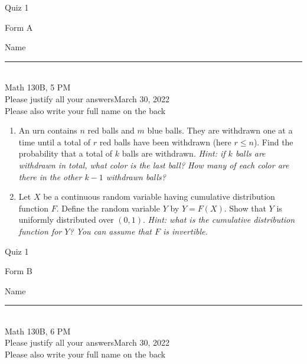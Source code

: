 \documentclass[12pt]{article}
\begin{document}
\begin{flushleft} 
\centerline{\LARGE{Quiz 1}} 
\vspace{5 mm}
{Form A}\hfill  
{Name \rule {2 in}{0.01in}}\\
Math 130B, 5 PM
\\
{Please justify all your answers}\hfill {March 30, 2022}
\\
{Please also write your full name on the back} 

\medskip
\end{flushleft}

\begin{enumerate}
	\item An urn contains $n$ red balls and $m$ blue balls. They are withdrawn one at a time until a total of $r$ red balls have been withdrawn (here $r\leq n$). Find the probability that a total of $k$ balls are withdrawn.
	\textit{Hint: if $k$ balls are withdrawn in total, what color is the last ball? How many of each color are there in the other $k-1$ withdrawn balls?}
	\vfill

	\item Let $X$ be a continuous random variable having cumulative distribution function $F$. Define the random variable $Y$ by $Y = F(X)$. Show that $Y$ is uniformly distributed over $(0,1)$.
	\textit{Hint: what is the cumulative distribution function for $Y$? You can assume that $F$ is invertible.}

	\vfill\null
\end{enumerate}
\pagebreak


\begin{flushleft} 
\centerline{\LARGE{Quiz 1}} 
\vspace{5 mm}
{Form B}\hfill  
{Name \rule {2 in}{0.01in}}\\
Math 130B, 6 PM
\\
{Please justify all your answers}\hfill {March 30, 2022}
\\
{Please also write your full name on the back} 

\medskip
\end{flushleft}
\end{document}
